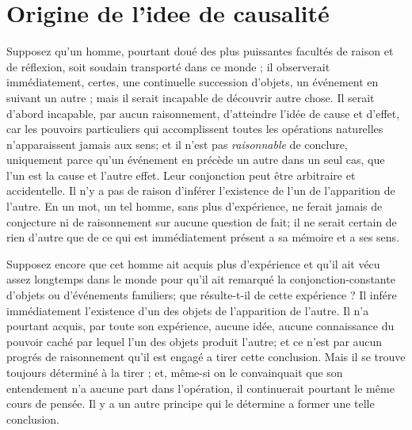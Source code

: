 
\section{Origine de l'idee de causalité}

Supposez qu’un homme, pourtant doué des plus puissantes
facultés de raison et de réflexion, soit soudain
transporté dans ce monde ; il observerait immédiatement,
certes, une continuelle succession d’objets, un événement
en suivant un autre ; mais il serait incapable de découvrir
autre chose. Il serait d’abord incapable, par aucun raisonnement,
d’atteindre l’idée de cause et d’effet, car les
pouvoirs particuliers qui accomplissent toutes les opérations
naturelles n’apparaissent jamais aux sens; et il
n’est pas {\it raisonnable} de conclure, uniquement parce
qu’un événement en précède un autre dans un seul cas,
que l'un est la cause et l’autre effet. Leur conjonction
peut être arbitraire et accidentelle. Il n’y a pas de raison
d'inférer l’existence de l'un de l’apparition de l’autre.
En un mot, un tel homme, sans plus d’expérience, ne
ferait jamais de conjecture ni de raisonnement sur aucune
question de fait; il ne serait certain de rien d’autre que
de ce qui est immédiatement présent a sa mémoire et
a ses sens.

Supposez encore que cet homme ait acquis plus d’expérience
et qu’il ait vécu assez longtemps dans le monde
pour qu’il ait remarqué la conjonction-constante d’objets
ou d’événements familiers; que résulte-t-il de cette
expérience ? Il infére immédiatement l’existence d’un
des objets de l’apparition de l’autre. Il n’a pourtant acquis,
par toute son expérience, aucune idée, aucune connaissance
du pouvoir caché par lequel l’un des objets produit
l'autre; et ce n’est par aucun progrés de raisonnement
qu’il est engagé a tirer cette conclusion. Mais il se trouve
toujours déterminé à la tirer ; et, même-si on le convainquait
que son entendement n’a aucune part dans l’opération,
il continuerait pourtant le même cours de pensée. Il y a un
autre principe qui le détermine a former une telle conclusion.

